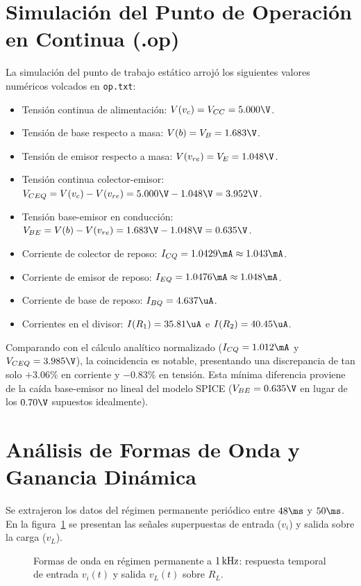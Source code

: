 \section{Simulación del Punto de Operación en Continua (.op)}

La simulación del punto de trabajo estático arrojó los siguientes valores numéricos volcados en \texttt{op.txt}:
\begin{itemize}
  \item Tensión continua de alimentación: $V(v_c) = V_{CC} = 5.000\V$.
  \item Tensión de base respecto a masa: $V(b) = V_B = 1.683\V$.
  \item Tensión de emisor respecto a masa: $V(v_{re}) = V_E = 1.048\V$.
  \item Tensión continua colector-emisor: $V_{CEQ} = V(v_c) - V(v_{re}) = 5.000\V - 1.048\V = 3.952\V$.
  \item Tensión base-emisor en conducción: $V_{BE} = V(b) - V(v_{re}) = 1.683\V - 1.048\V = 0.635\V$.
  \item Corriente de colector de reposo: $I_{CQ} = 1.0429\mA \approx 1.043\mA$.
  \item Corriente de emisor de reposo: $I_{EQ} = 1.0476\mA \approx 1.048\mA$.
  \item Corriente de base de reposo: $I_{BQ} = 4.637\uA$.
  \item Corrientes en el divisor: $I(R_1) = 35.81\uA$ e $I(R_2) = 40.45\uA$.
\end{itemize}

Comparando con el cálculo analítico normalizado ($I_{CQ} = 1.012\mA$ y $V_{CEQ} = 3.985\V$), la coincidencia es
notable, presentando una discrepancia de tan solo $+3.06\%$ en corriente y $-0.83\%$ en tensión. Esta mínima diferencia
proviene de la caída base-emisor no lineal del modelo SPICE ($V_{BE} = 0.635\V$ en lugar de los $0.70\V$ supuestos
idealmente).

\section{Análisis de Formas de Onda y Ganancia Dinámica}

Se extrajeron los datos
del régimen permanente periódico entre $48\ms$ y $50\ms$. En la figura~\ref{fig:sim_waveforms} se presentan las señales
superpuestas de entrada ($v_i$) y salida sobre la carga ($v_L$).

\begin{figure}[!ht]
  \centering
  
  \caption{Formas de onda en régimen permanente a $1\,\mathrm{kHz}$: respuesta temporal de entrada $v_i(t)$ y salida $v_L(t)$ sobre $R_L$.}
  \label{fig:sim_waveforms}
\end{figure}

